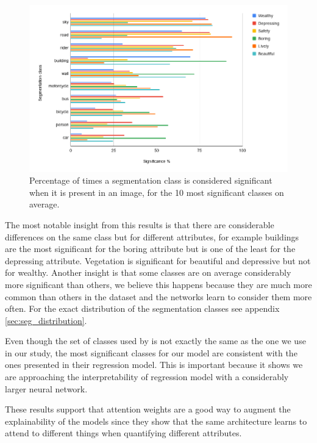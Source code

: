 \begin{figure}[ht]
	\begin{center}
	\includegraphics[width=1\textwidth]{./figures/present_significance.png}
	\caption[Percentage of class significance when present]{
		Percentage of times a segmentation class is considered significant when it is present in an image, for the
		10 most significant classes on average.
        }
	\label{fig:presence_sig}
	\end{center}
\end{figure}


The most notable insight from this results is that there are considerable differences on the same class
but for different attributes, for example buildings are the most significant for the boring attribute
but is one of the least for the depressing attribute. Vegetation is significant for beautiful and
depressive but not for wealthy. Another insight is that some classes are on average considerably more significant
than others, we believe this happens because they are much more common than others in the dataset
and the networks learn to consider them more often. For the exact distribution of the segmentation classes
see appendix \ref{sec:seg_distribution}.

Even though the  set of classes used by  is not exactly the same as
the one we use in our study, the most significant classes for our model are consistent with
the ones presented in their regression model. This is important because it shows we
are approaching the interpretability of regression model with a considerably larger
neural network.

These results support that attention weights are a good way to augment the explainability of
the models since they show that the same architecture learns to attend to different things
when quantifying different attributes.


